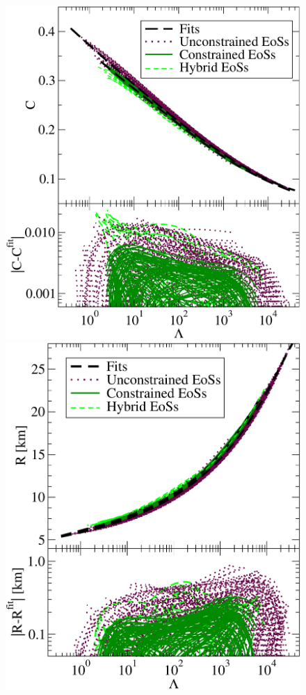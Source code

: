 \documentclass[prd,twocolumn,nofootinbib,superscriptaddress,amsmath,amssymb]{revtex4-1}
\begin{document}
\begin{figure}
\begin{center} 
\includegraphics[width=\columnwidth]{CL.pdf}
\includegraphics[width=.96\columnwidth]{RL.pdf}

\end{center}
\end{figure}
\end{document}
